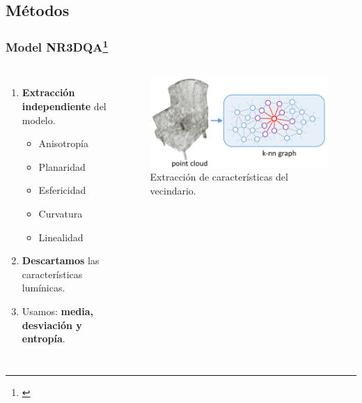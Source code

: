 \subsection{Métodos}
\begin{frame}
  \frametitle{Model NR3DQA\footnote[frame]{\cite{NR3DQA}}}
  \begin{columns}
    \begin{enumerate}
      \item \textbf{Extracción independiente} del modelo.
        \begin{itemize}
          \item Anisotropía
          \item Planaridad
          \item Esfericidad 
          \item Curvatura 
          \item Linealidad
        \end{itemize}
      \item \textbf{Descartamos} las características lumínicas.
      \item Usamos: \textbf{media, desviación y entropía}.
    \end{enumerate}
    \begin{figure}
      \begin{center}
        \includegraphics[width=\textwidth]{imagenes/chapter3/PatchSelection}
      \end{center}
      \caption{Extracción de características del vecindario.}
    \end{figure}
    \end{columns}
\end{frame}

